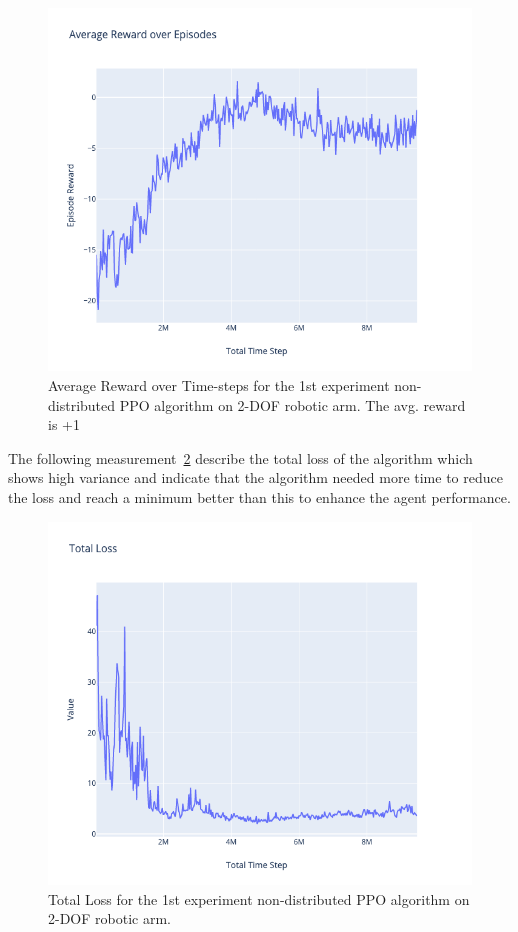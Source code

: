 \begin{figure}[H] %
	\centering
	\includegraphics[width=1.2\linewidth]{figures/exps/1st_exp/avg_eps_reward}
	\caption{Average Reward over Time-steps for the 1st experiment non-distributed PPO algorithm on 2-DOF robotic arm. The avg. reward is +1}
	\label{fig:1st_exp_avg_eps_reward}
\end{figure}
The following measurement~\ref{fig:1st_exp_total_loss} describe the total loss of the algorithm which shows high variance and indicate that the algorithm needed more time to reduce the loss and reach a minimum better than this to enhance the agent performance.
\begin{figure}[H] %
	\centering
	\includegraphics[width=1.2\linewidth]{figures/exps/1st_exp/total_loss}
	\caption{Total Loss for the 1st experiment non-distributed PPO algorithm on 2-DOF robotic arm.}
	\label{fig:1st_exp_total_loss}
\end{figure}
